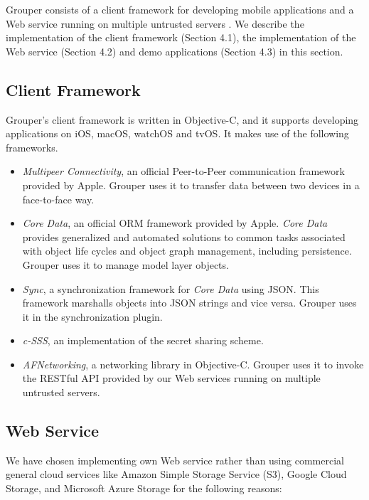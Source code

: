 \documentclass[twocolumn,10pt]{article}
\begin{document}
Grouper consists of a client framework for developing mobile applications and a Web service running on multiple untrusted servers .
We describe the implementation of the client framework (Section 4.1), the implementation of the Web service (Section 4.2) and demo applications (Section 4.3) in this section.

\subsection{Client Framework}

Grouper's client framework is written in Objective-C, and it supports developing applications on iOS, macOS, watchOS and tvOS.
It makes use of the following frameworks.   

\begin{itemize}
	\setlength{\itemsep}{1pt}
	\setlength{\parskip}{0pt}
	\setlength{\parsep}{0pt}
	\item 
	\emph{Multipeer Connectivity}\cite{mc},  an official Peer-to-Peer communication framework provided by Apple. 
	Grouper uses it to transfer data between two devices in a face-to-face way.
	\item 
	\emph{Core Data}\cite{coredata}, an official ORM framework provided by Apple.
	\emph{Core Data} provides generalized and automated solutions to common tasks associated with object life cycles and object graph management, including persistence. 
	Grouper uses it to manage model layer objects. 
	\item 
	\emph{Sync}\cite{sync}, a synchronization framework for \emph{Core Data} using JSON. 
	This framework marshalls objects into JSON strings and vice versa. 
	Grouper uses it in the synchronization plugin.
	\item 
	\emph{c-SSS}\cite{c-sss}, an implementation of the secret sharing scheme.
	\item 
	\emph{AFNetworking}\cite{afnetworking}, a networking library in Objective-C. 
	Grouper uses it to invoke the RESTful API provided by our Web services running on multiple untrusted servers. 
\end{itemize}

\subsection{Web Service}

We have chosen implementing own Web service rather than using commercial general cloud services like Amazon Simple Storage Service (S3), Google Cloud Storage, and Microsoft Azure Storage for the following reasons:
\end{document}
